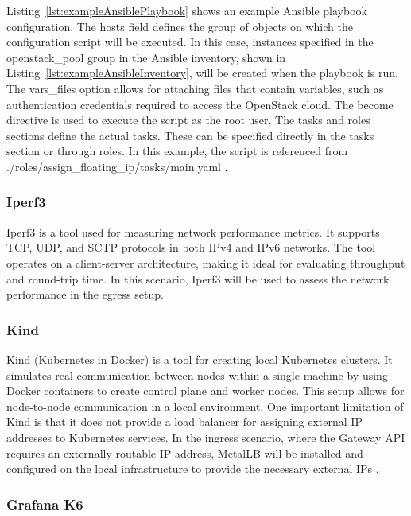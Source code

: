 Listing~\ref{lst:exampleAnsiblePlaybook} shows an example Ansible playbook configuration. The hosts field defines the group of objects on which the configuration script will be executed. In this case, instances specified in the openstack\_pool group in the Ansible inventory, shown in Listing~\ref{lst:exampleAnsibleInventory}, will be created when the playbook is run. The vars\_files option allows for attaching files that contain variables, such as authentication credentials required to access the OpenStack cloud. The become directive is used to execute the script as the root user. The tasks and roles sections define the actual tasks. These can be specified directly in the tasks section or through roles. In this example, the script is referenced from ./roles/assign\_floating\_ip/tasks/main.yaml \cite{AnsibleDocs}.


\subsubsection{Iperf3}
\label{sec:iperf3}

Iperf3 is a tool used for measuring network performance metrics. It supports TCP, UDP, and SCTP protocols in both IPv4 and IPv6 networks. The tool operates on a client-server architecture, making it ideal for evaluating throughput and round-trip time. In this scenario, Iperf3 will be used to assess the network performance in the egress setup.

\subsubsection{Kind}
\label{sec:kind}

Kind (Kubernetes in Docker) is a tool for creating local Kubernetes clusters. It simulates real communication between nodes within a single machine by using Docker containers to create control plane and worker nodes. This setup allows for node-to-node communication in a local environment. One important limitation of Kind is that it does not provide a load balancer for assigning external IP addresses to Kubernetes services. In the ingress scenario, where the Gateway API requires an externally routable IP address, MetalLB will be installed and configured on the local infrastructure to provide the necessary external IPs \cite{Kind}.

\subsubsection{Grafana K6}
\label{sec:grafana}

